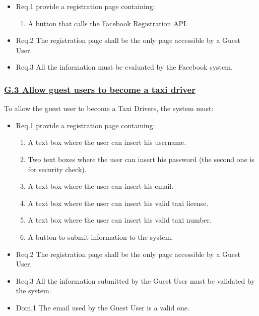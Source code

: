 				\begin{itemize}
					\item \lbrack Req.1\rbrack \label{sec:fr1_g2} provide a registration page containing:
						\begin{enumerate}
							\item A button that calls the Facebook Registration API.
						\end{enumerate}
					\item \lbrack Req.2\rbrack \label{sec:fr2_g2} The registration page shall be the only page accessible by a Guest User.
					\item \lbrack Req.3\rbrack \label{sec:fr3_g2} All the information must be evaluated by the Facebook system.
				\end{itemize}

			\subsubsection{\lbrack \hyperref[sec:g3]{G.3 Allow guest users to become a taxi driver}\rbrack}\label{sec:frs3}
			To allow the guest user to become a Taxi Drivers, the system must:


				\begin{itemize}
					\item \lbrack Req.1\rbrack \label{sec:fr1_g3} provide a registration page containing:
						\begin{enumerate}
							\item A text box where the user can insert his username.
							\item Two text boxes where the user can insert his password (the second one is for security check).
							\item A text box where the user can insert his email.
							\item A text box where the user can insert his valid taxi license.
							\item A text box where the user can insert his valid taxi number.
							\item A button to submit information to the system.
						\end{enumerate}
					\item \lbrack Req.2\rbrack \label{sec:fr2_g3} The registration page shall be the only page accessible by a Guest User.
					\item \lbrack Req.3\rbrack \label{sec:fr3_g3} All the information submitted by the Guest User must be validated by the system.
					\item \lbrack Dom.1\rbrack \label{sec:da1_g3} The email used by the Guest User is a valid one.
				\end{itemize}

